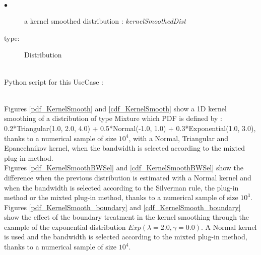 \textspace\\
             {
               \begin{description}
               \item[$\bullet$] a kernel smoothed distribution : {\itshape kernelSmoothedDist}
               \item[type:]  Distribution
               \end{description}
             }

             \textspace\\
             Python script for this UseCase :


             \textspace\\


             Figures \ref{pdf_KernelSmooth} and \ref{cdf_KernelSmooth}  show a 1D kernel smoothing of a distribution of type Mixture which PDF is defined by : 0.2*Triangular(1.0, 2.0, 4.0) + 0.5*Normal(-1.0, 1.0) + 0.3*Exponential(1.0, 3.0), thanks to a numerical sample of size $10^4$, with a Normal,  Triangular and Epanechnikov kernel, when the  bandwidth is selected according to the mixted plug-in method.\\

             Figures \ref{pdf_KernelSmoothBWSel} and \ref{cdf_KernelSmoothBWSel} show the difference when the previous distribution is estimated with  a Normal kernel and when the bandwidth is selected according to the Silverman rule, the plug-in method or the mixted plug-in method, thanks to a numerical sample of size $10^3$.\\

             Figures \ref{pdf_KernelSmooth_boundary} and \ref{cdf_KernelSmooth_boundary} show the effect of the boundary treatment in the kernel smoothing through the example of the exponential distribution $Exp(\lambda = 2.0, \gamma = 0.0)$. A Normal kernel is used and the  bandwidth is selected according to the mixted plug-in method, thanks to a numerical sample of size $10^4$.


